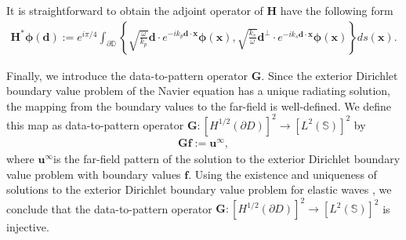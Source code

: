 \documentclass[11pt,reqno,twoside]{amsart}
\theoremstyle{definition}
\theoremstyle{remark}
\numberwithin{equation}{section}
\begin{document}
	 	It is straightforward to obtain the adjoint operator of $\mathbf H$ have the following form
	 	\begin{align}\label{eq:HerglotzOperatorDA}
	 		\mathbf{H^* \phi }\left( \mathbf d\right) :=e^{i\pi /4} \int_{\partial \mathbb D}  \left\lbrace \sqrt{\frac{\omega}{k_p}}\mathbf{d} \cdot e^{-ik_p\mathbf{d}\cdot\mathbf{x}}\mathbf{\phi}\left( \mathbf{x}\right)  , \sqrt{\frac{k_s}{\omega}}\mathbf{d}^{\perp} \cdot e^{-ik_s\mathbf{d}\cdot\mathbf{x}}\mathbf{\phi}\left( \mathbf{x}\right)\right\rbrace ds(\mathbf{x}).
	 	\end{align}
	 	
	 	Finally, we introduce the data-to-pattern operator $\mathbf G$. Since the exterior Dirichlet boundary value problem of the Navier equation has a unique radiating solution, the mapping from the boundary values to the far-field is well-defined. We define this map as data-to-pattern operator $\mathbf G : \left[H^{1/2}\left(\partial D\right) \right] ^2 \to \left[L^2\left(\mathbb S\right) \right] ^2 $ by
	 	\begin{align}\label{eq:DatatoPatternOperator}
	 		\mathbf G \mathbf f:=\mathbf{u}^{\infty},
	 	\end{align}
	 	where $\mathbf{u}^{\infty}$is the far-field pattern of the solution to the exterior Dirichlet boundary value problem with boundary values $\mathbf f$. Using the existence and uniqueness of solutions to the exterior Dirichlet boundary value problem for elastic waves \cite{HH93}, we conclude that the data-to-pattern operator $\mathbf{G}: \left[H^{1/2}\left(\partial D\right) \right] ^2 \to \left[L^2\left(\mathbb S\right) \right] ^2$ is injective.
	 	
\end{document}
